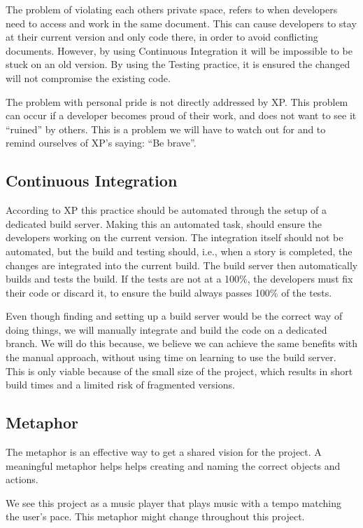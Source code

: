 The problem of violating each others private space, refers to when developers need to access and work in the same document. This can cause developers to stay at their current version and only code there, in order to avoid conflicting documents.
However, by using Continuous Integration it will be impossible to be stuck on an old version.
By using the Testing practice, it is ensured the changed will not compromise the existing code.

The problem with personal pride is not directly addressed by XP.
This problem can occur if a developer becomes proud of their work, and does not want to see it ``ruined'' by others.
This is a problem we will have to watch out for and to remind ourselves of XP's saying: ``Be brave''.
 

\subsection{Continuous Integration}
According to XP this practice should be automated through the setup of a dedicated build server.
Making this an automated task, should ensure the developers working on the current version.
The integration itself should not be automated, but the build and testing should, i.e., when a story is completed, the changes are integrated into the current build.
The build server then automatically builds and tests the build.
If the tests are not at a 100\%, the developers must fix their code or discard it, to ensure the build always passes 100\% of the tests.

Even though finding and setting up a build server would be the correct way of doing things, we will manually integrate and build the code on a dedicated branch.
We will do this because, we believe we can achieve the same benefits with the manual approach, without using time on learning to use the build server.
This is only viable because of the small size of the project, which results in short build times and a limited risk of fragmented versions.

\subsection{Metaphor}
The metaphor is an effective way to get a shared vision for the project.
A meaningful metaphor helps helps creating and naming the correct objects and actions.

We see this project as a music player that plays music with a tempo matching the user's pace.
This metaphor might change throughout this project.

